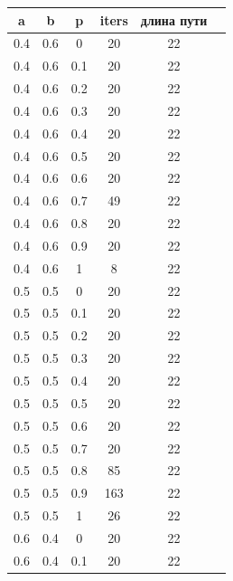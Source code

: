 \documentclass[a4paper,12pt]{article}
\begin{document}
	    \begin{table}[!h]	
	    	\begin{center}
	    \begin{tabular}{c@{\hspace{7mm}}c@{\hspace{7mm}}c@{\hspace{7mm}}c@{\hspace{7mm}}c@{\hspace{7mm}}c}
	    	
	    	\toprule
	    	a        &b      &p      &iters &длина пути \\
	    	\midrule
	    	0.4     &0.6    &0      &20    &22\\
	    	0.4     &0.6    &0.1    &20    &22\\
	    	0.4     &0.6    &0.2    &20    &22\\
	    	0.4     &0.6    &0.3    &20    &22\\
	    	0.4     &0.6    &0.4    &20    &22\\
	    	0.4     &0.6    &0.5    &20    &22\\
	    	0.4     &0.6    &0.6    &20    &22\\
	    	0.4     &0.6    &0.7    &49    &22\\
	    	0.4     &0.6    &0.8    &20    &22\\
	    	0.4     &0.6    &0.9    &20    &22\\
	    	0.4     &0.6    &1      &8     &22\\
	    	\midrule
	    	0.5     &0.5    &0      &20    &22\\
	    	0.5     &0.5    &0.1    &20    &22\\
	    	0.5     &0.5    &0.2    &20    &22\\
	    	0.5     &0.5    &0.3    &20    &22\\
	    	0.5     &0.5    &0.4    &20    &22\\
	    	0.5     &0.5    &0.5    &20    &22\\
	    	0.5     &0.5    &0.6    &20    &22\\
	    	0.5     &0.5    &0.7    &20    &22\\
	    	0.5     &0.5    &0.8    &85    &22\\
	    	0.5     &0.5    &0.9    &163   &22\\
	    	0.5     &0.5    &1      &26    &22\\
	    	\midrule
	    	0.6     &0.4    &0      &20    &22\\
	    	0.6     &0.4    &0.1    &20    &22\\

\end{tabular}
\end{center}
\end{table}
\end{document}
